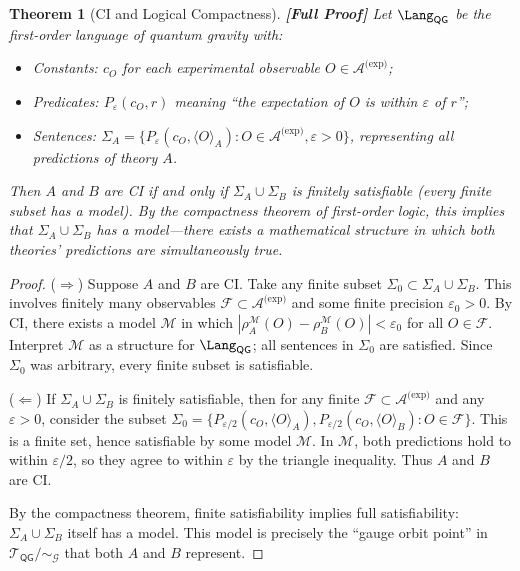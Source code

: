 \documentclass[12pt,a4paper]{article}
\newcommand{\braket}[1]{\langle #1 \rangle}
\newtheorem{theorem}{Theorem}[section]
\theoremstyle{remark}
\newcommand{\F}{\mathcal{F}}
\newcommand{\M}{\mathcal{M}}
\newcommand{\G}{\mathcal{G}}
\newcommand{\T}{\mathcal{T}}
\newcommand{\A}{\mathcal{A}}
\newcommand{\CI}{\textsf{CI}}
\newcommand{\QG}{\textsf{QG}}
\newcommand{\rigorFull}{\textbf{[Full Proof]}}
\begin{document}
\begin{theorem}[CI and Logical Compactness]
\label{thm:ci_logic}
\rigorFull
Let $\Lang_{\QG}$ be the first-order language of quantum gravity with:
\begin{itemize}[leftmargin=*]
  \item Constants: $c_O$ for each experimental observable $O \in \A^{\text{(exp)}}$;
  \item Predicates: $P_{\varepsilon}(c_O, r)$ meaning ``the expectation of $O$ is within $\varepsilon$ of $r$'';
  \item Sentences: $\Sigma_A = \{P_{\varepsilon}(c_O, \braket{O}_A) : O \in \A^{\text{(exp)}}, \varepsilon > 0\}$,
  representing all predictions of theory $A$.
\end{itemize}
Then $A$ and $B$ are \CI{} if and only if $\Sigma_A \cup \Sigma_B$ is finitely satisfiable (every finite subset has a model). By the compactness theorem of first-order logic, this implies that $\Sigma_A \cup \Sigma_B$ has a model---there exists a mathematical structure in which both theories' predictions are simultaneously true.
\end{theorem}

\begin{proof}
($\Rightarrow$) Suppose $A$ and $B$ are \CI{}. Take any finite subset $\Sigma_0 \subset \Sigma_A \cup \Sigma_B$. This involves finitely many observables $\F \subset \A^{\text{(exp)}}$ and some finite precision $\varepsilon_0 > 0$. By \CI{}, there exists a model $\M$ in which $|\rho_A^{\M}(O) - \rho_B^{\M}(O)| < \varepsilon_0$ for all $O \in \F$. Interpret $\M$ as a structure for $\Lang_{\QG}$; all sentences in $\Sigma_0$ are satisfied. Since $\Sigma_0$ was arbitrary, every finite subset is satisfiable.

($\Leftarrow$) If $\Sigma_A \cup \Sigma_B$ is finitely satisfiable, then for any finite $\F \subset \A^{\text{(exp)}}$ and any $\varepsilon > 0$, consider the subset $\Sigma_0 = \{P_{\varepsilon/2}(c_O, \braket{O}_A), P_{\varepsilon/2}(c_O, \braket{O}_B) : O \in \F\}$. This is a finite set, hence satisfiable by some model $\M$. In $\M$, both predictions hold to within $\varepsilon/2$, so they agree to within $\varepsilon$ by the triangle inequality. Thus $A$ and $B$ are \CI{}.

By the compactness theorem, finite satisfiability implies full satisfiability: $\Sigma_A \cup \Sigma_B$ itself has a model. This model is precisely the ``gauge orbit point'' in $\T_{\QG}/\sim_{\G}$ that both $A$ and $B$ represent.
\end{proof}
\end{document}
